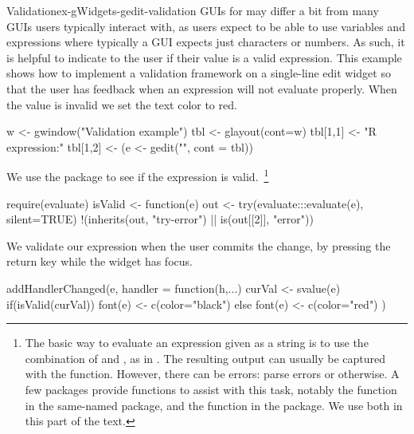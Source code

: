 \begin{example}{Validation}{ex-gWidgets-gedit-validation}
GUIs for \R\/ may differ a bit from many GUIs users typically
interact with, as \R\/ users expect to be able to use variables and
expressions where typically a GUI expects just characters or
numbers. As such, it is helpful to indicate to the user if their value
is a valid expression. This example shows how to implement a
validation framework on a single-line edit widget so that the user has
feedback when an expression will not evaluate properly.  When the
value is invalid we set the text color to red.


\begin{Schunk}
\begin{Sinput}
 w <- gwindow("Validation example")
 tbl <- glayout(cont=w)
 tbl[1,1] <- "R expression:"
 tbl[1,2] <- (e <- gedit("", cont = tbl))
\end{Sinput}
\end{Schunk}


We use the  package to see
if the expression is valid.~\footnote{The basic way to evaluate an
  \R{} expression given as a string is to use the combination of
   and , as in
  . The resulting output can usually be
  captured with the  function. However, there
  can be errors: parse errors or otherwise. A few packages provide
  functions to assist with this task, notably the 
  function in the same-named  package, and the
   function in the  package. We use both
  in this part of the text.}
\begin{Schunk}
\begin{Sinput}
 require(evaluate)
 isValid <- function(e) {
   out <- try(evaluate:::evaluate(e), silent=TRUE)
   !(inherits(out, "try-error") ||  is(out[[2]], "error"))
 }
\end{Sinput}
\end{Schunk}
%

We validate our expression when the user commits the change, by
pressing the return key while the widget has focus. 


\begin{Schunk}
\begin{Sinput}
 addHandlerChanged(e, handler = function(h,...) {
   curVal <- svalue(e)
   if(isValid(curVal)) {
     font(e) <- c(color="black")
   } else {
     font(e) <- c(color="red")
   }
 })
\end{Sinput}
\end{Schunk}

\end{example}

